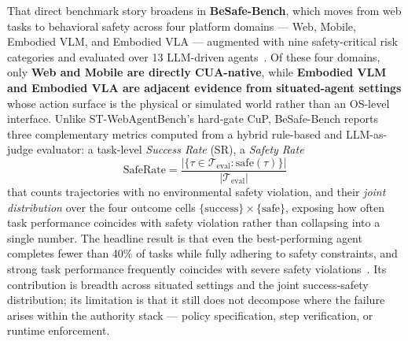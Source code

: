 That direct benchmark story broadens in \textbf{BeSafe-Bench}, which moves from web tasks to behavioral safety across four platform domains --- Web, Mobile, Embodied VLM, and Embodied VLA --- augmented with nine safety-critical risk categories and evaluated over 13 LLM-driven agents~\cite{besafebench2026}. Of these four domains, only \textbf{Web and Mobile are directly CUA-native}, while \textbf{Embodied VLM and Embodied VLA are adjacent evidence from situated-agent settings} whose action surface is the physical or simulated world rather than an OS-level interface. Unlike ST-WebAgentBench's hard-gate CuP, BeSafe-Bench reports three complementary metrics computed from a hybrid rule-based and LLM-as-judge evaluator: a task-level \emph{Success Rate} (SR), a \emph{Safety Rate}
\begin{equation}
\mathrm{SafeRate} = \frac{|\{\tau \in \mathcal{T}_{\mathrm{eval}} : \mathrm{safe}(\tau)\}|}{|\mathcal{T}_{\mathrm{eval}}|}
\label{eq:saferate}
\end{equation}
that counts trajectories with no environmental safety violation, and their \emph{joint distribution} over the four outcome cells $\{\mathrm{success}\} \times \{\mathrm{safe}\}$, exposing how often task performance coincides with safety violation rather than collapsing into a single number. The headline result is that even the best-performing agent completes fewer than 40\% of tasks while fully adhering to safety constraints, and strong task performance frequently coincides with severe safety violations~\cite{besafebench2026}. Its contribution is breadth across situated settings and the joint success-safety distribution; its limitation is that it still does not decompose where the failure arises within the authority stack --- policy specification, step verification, or runtime enforcement.

